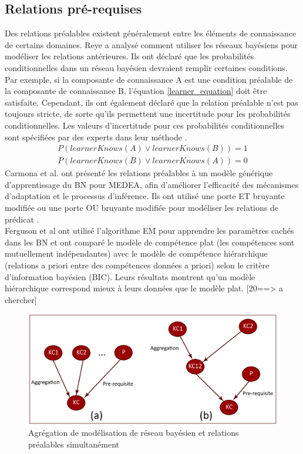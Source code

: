 \subsection{Relations pré-requises}
Des relations préalables existent généralement entre les éléments de connaissance de certains domaines.
Reye a analysé comment utiliser les réseaux bayésiens pour modéliser les relations antérieures. Ils ont déclaré que les probabilités conditionnelles dans un réseau bayésien devraient remplir certaines conditions. Par exemple, si la composante de connaissance A est une condition préalable de la composante de connaissance B, l'équation \ref{learner_equation} doit être satisfaite. Cependant, ils ont également déclaré que la relation préalable n'est pas toujours stricte, de sorte qu'ils permettent une incertitude pour les probabilités conditionnelles. Les valeurs d'incertitude pour ces probabilités conditionnelles sont spécifiées par des experts dans leur méthode \cite{Student_Modelling_Based_on_Belief_Networks}.
\begin{equation}
	\begin{split}
		P(learnerKnows(A) \vee  learnerKnows(B)) = 1\\
	P(learnerKnows(B) \vee learnerKnows(A)) = 0
	\end{split}
	\label{learner_equation}
\end{equation}
Carmona et al. ont présenté les relations préalables à un modèle générique d'apprentissage du BN pour MEDEA, afin d'améliorer l'efficacité des mécanismes d'adaptation et le processus d'inférence. Ils ont utilisé une porte ET bruyante modifiée ou une porte OU bruyante modifiée pour modéliser les relations de prédicat \cite{Prerequisite_Relations_in_Multilayered_Bayesian_Student_Model}. \\
Ferguson et al ont utilisé l'algorithme EM pour apprendre les paramètres cachés dans les BN et ont comparé le modèle de compétence plat (les compétences sont mutuellement indépendantes) avec le modèle de compétence hiérarchique (relations a priori entre des compétences données a priori) selon le critère d'information bayésien (BIC). Leurs résultats montrent qu'un modèle hiérarchique correspond mieux à leurs données que le modèle plat. [20==> a chercher]

\begin{figure}[H]
	\begin{center}
		\includegraphics[width=\textwidth]{images/chapitre2/bayesian_network_modeling_aggregationai.png}
	\end{center}
\caption{Agrégation de modélisation de réseau bayésien et relations préalables simultanément}
\label{agregationModelisation}
\end{figure}

